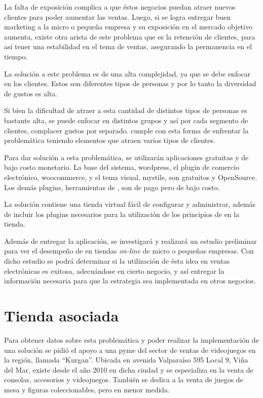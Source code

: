 La falta de exposición complica a que éstos negocios puedan atraer nuevos clientes
para poder aumentar las ventas.
Luego, si se logra entregar buen marketing a la micro o pequeña empresa y su
exposición en el mercado objetivo aumenta, existe otra arista de este problema
que es la retención de clientes, para así tener una estabilidad en el tema
de ventas, asegurando la permanencia en el tiempo.

La solución a este problema es de una alta complejidad, ya que se debe enfocar en
los clientes.
Estos son diferentes tipos de personas y por lo tanto la diversidad de gustos es
alta.

Si bien la dificultad de atraer a esta cantidad de distintos tipos de personas
es bastante alta, se puede enfocar en distintos grupos y así por cada segmento
de clientes, complacer gustos por separado.
{\GAM} cumple con esta forma de enfrentar la problemática teniendo elementos que
atraen varios tipos de clientes.

Para dar solución a esta problemática, se utilizarán aplicaciones gratuitas y de
bajo costo monetario. La base del sistema, wordpress, el plugin de comercio
electrónico, woocommerce, y el tema visual, mystile, son gratuitos y OpenSource.
Los demás plugins, herramientas de {\GAM}, son de pago pero de bajo costo.

La solución contiene una tienda virtual fácil de configurar y administrar,
además de incluir los plugins necesarios para la utilización de los principios
de {\GAM} en la tienda.

Además de entregar la aplicación, se investigará y realizará un estudio preliminar
para ver el desempeño de {\GAM} en tiendas \emph{on-line} de micro o pequeñas empresas.
Con dicho estudio se podrá determinar si la utilización de ésta idea en ventas
electrónicas es exitosa, adecuándose en cierto negocio,
y así entregar la información necesaria para que la estrategia sea implementada
en otros negocios.

\section{Tienda asociada}

Para obtener datos sobre esta problemática y poder realizar la implementación de una
solución se pidió el apoyo a una pyme del sector de ventas de videojuegos en la región,
llamada ``Kurgan''. Ubicada en avenida Valparaíso 595 Local 9, Viña del Mar, existe desde
el año 2010 en dicha ciudad y se especializa en la venta de consolas, accesorios y videojuegos.
También se dedica a la venta de juegos de mesa y figuras coleccionables, pero en menor medida.

